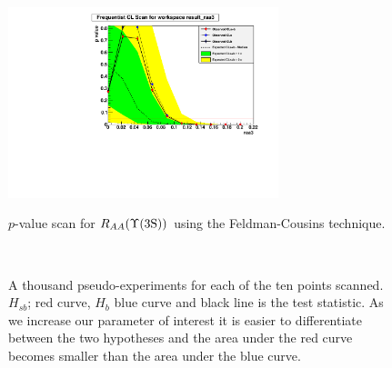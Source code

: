 \begin{figure}[hbtp]
  \begin{center}
\includegraphics[angle=0,width=0.7\textwidth]{figures/limits//FC_Raa_Limit_MB}\label{fig:/FC_Raa_Limit_MB}
   \caption{$p$-value scan for $R_{AA}(\Upsilon\mathrm{(3S)})$ using the Feldman-Cousins technique.}
   \label{fig:FC_Raa_Limit_MB}
 \end{center}
\end{figure}

\begin{figure}[hbtp]
  \begin{center}
   \\
   \caption{A thousand pseudo-experiments for each of the ten points scanned. %
$H_{sb}$; red curve, $H_{b}$ blue curve and black line is the test statistic. As we increase our parameter of interest it is easier to differentiate between the two hypotheses and the area under the red curve becomes smaller than the area under the blue curve.}
   \label{fig:Raatoys}
 \end{center}
\end{figure}

